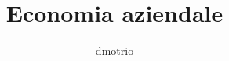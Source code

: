 \documentclass[a4paper]{report}
\title{Economia aziendale}
\author{dmotrio}
\begin{document}
    \begin{titlepage}
        \maketitle
    \end{titlepage}

    \tableofcontents



    
    
\end{document}
